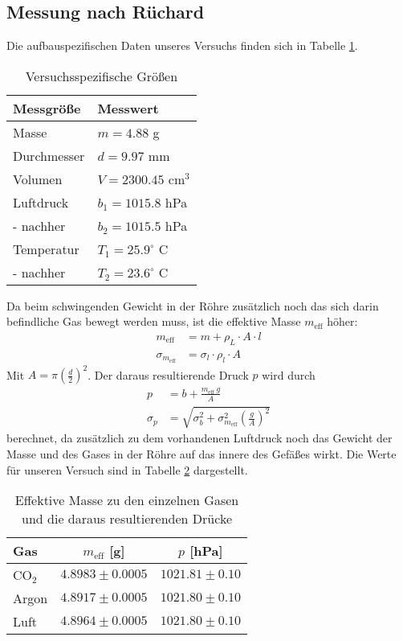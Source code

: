 \documentclass[12pt,a4paper,titlepage,headinclude,bibtotoc]{scrartcl}
\begin{document}
\subsection{Messung nach Rüchard}
Die aufbauspezifischen Daten unseres Versuchs finden sich in Tabelle \ref{tab:versgr}.
\begin{table}[!h]
	\centering
	\begin{tabular}{|l|l|}
		\hline
		Messgröße	& Messwert\\\hline\hline
		Masse		& $m=4.88$ g\\\hline
		Durchmesser	& $d=9.97$ mm\\\hline
		Volumen		& $V=2300.45$ cm$^3$\\\hline
		Luftdruck	& $b_1=1015.8$ hPa\\
		- nachher	& $b_2=1015.5$ hPa\\\hline
		Temperatur	& $T_1=25.9^\circ$ C\\
		- nachher	& $T_2=23.6^\circ$ C\\\hline
	\end{tabular}
	\caption{Versuchsspezifische Größen}
	\label{tab:versgr}
\end{table}
Da beim schwingenden Gewicht in der Röhre zusätzlich noch das sich darin befindliche Gas bewegt werden muss, ist die effektive Masse $m_\text{eff}$ höher:
\begin{align*}
	m_\text{eff}&=m+\rho_L \cdot A\cdot l\\
	\sigma_{m_\text{eff}}&=\sigma_l\cdot \rho_l \cdot A
\end{align*}
Mit $A=\pi \left( \frac{d}{2} \right)^2$. Der daraus resultierende Druck $p$ wird durch
\begin{align*}
	p&=b+\frac{m_\text{eff}~g}{A}\\
	\sigma_p&=\sqrt{\sigma_b^2+\sigma_{m_\text{eff}}^2\left(\frac{g}{A}\right)^2}
\end{align*}
berechnet, da zusätzlich zu dem vorhandenen Luftdruck noch das Gewicht der Masse und des Gases in der Röhre auf das innere des Gefäßes wirkt.
Die Werte für unseren Versuch sind in Tabelle \ref{tab:effm} dargestellt.
\begin{table}[!htbp]
	\centering
	\begin{tabular}{|l|c|c|}
		\hline
		Gas	& $m_\text{eff}$ [g]	& $p$ [hPa]\\\hline\hline
		CO$_2$	& $4.8983 \pm 0.0005$ 	& $1021.81 \pm 0.10$ \\\hline
		Argon	& $4.8917 \pm 0.0005$ 	& $1021.80 \pm 0.10$ \\\hline
		Luft	& $4.8964 \pm 0.0005$ 	& $1021.80 \pm 0.10$ \\\hline
	\end{tabular}
	\caption{Effektive Masse zu den einzelnen Gasen und die daraus resultierenden Drücke} 
	\label{tab:effm}
\end{table}
\end{document}
